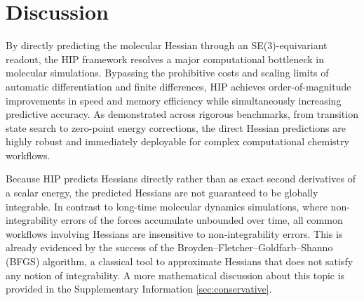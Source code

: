 \documentclass[pdflatex,sn-mathphys-num]{sn-jnl}%
\theoremstyle{thmstyleone}%
\theoremstyle{thmstyletwo}%
\theoremstyle{thmstylethree}%
\begin{document}
\section{Discussion}
By directly predicting the molecular Hessian through an SE(3)-equivariant readout, the HIP framework resolves a major computational bottleneck in molecular simulations. Bypassing the prohibitive costs and scaling limits of automatic differentiation and finite differences, HIP achieves order-of-magnitude improvements in speed and memory efficiency while simultaneously increasing predictive accuracy. As demonstrated across rigorous benchmarks, from transition state search to zero-point energy corrections, the direct Hessian predictions are highly robust and immediately deployable for complex computational chemistry workflows.   



Because HIP predicts Hessians directly rather than as exact second derivatives of a scalar energy, the predicted Hessians are not guaranteed to be globally integrable. In contrast to long-time molecular dynamics simulations, where non-integrability errors of the forces accumulate unbounded over time, all common workflows involving Hessians are insensitive to non-integrability errors. This is already evidenced by the success of the Broyden–Fletcher–Goldfarb–Shanno (BFGS) algorithm, a classical tool to approximate Hessians that does not satisfy any notion of integrability. A more mathematical discussion about this topic is provided in the Supplementary Information \ref{sec:conservative}.
\end{document}
